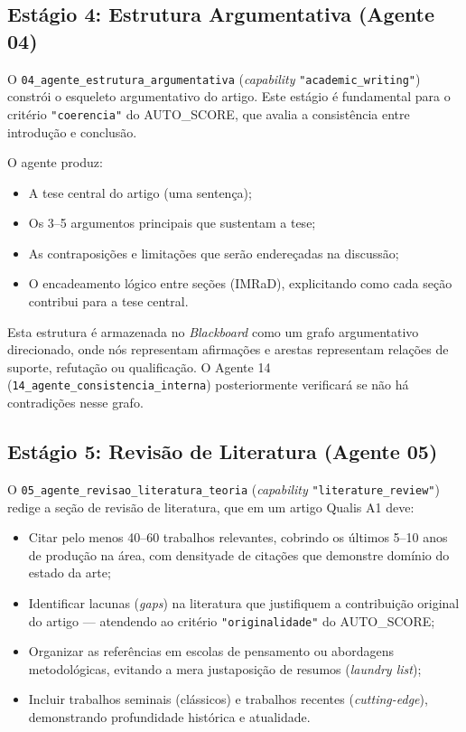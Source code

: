 \subsection{Estágio 4: Estrutura Argumentativa (Agente 04)}
\label{sec:estagio4}

O \texttt{04\_agente\_estrutura\_argumentativa}
(\textit{capability} \texttt{"academic\_writing"}) constrói o
esqueleto argumentativo do artigo. Este estágio é fundamental para
o critério \texttt{"coerencia"} do AUTO\_SCORE, que avalia a
consistência entre introdução e conclusão.

O agente produz:

\begin{itemize}
    \item A tese central do artigo (uma sentença);

    \item Os 3--5 argumentos principais que sustentam a tese;

    \item As contraposições e limitações que serão endereçadas na
    discussão;

    \item O encadeamento lógico entre seções (IMRaD), explicitando
    como cada seção contribui para a tese central.
\end{itemize}

Esta estrutura é armazenada no \textit{Blackboard} como um grafo
argumentativo direcionado, onde nós representam afirmações e
arestas representam relações de suporte, refutação ou qualificação.
O Agente 14 (\texttt{14\_agente\_consistencia\_interna})
posteriormente verificará se não há contradições nesse grafo.

\subsection{Estágio 5: Revisão de Literatura (Agente 05)}
\label{sec:estagio5}

O \texttt{05\_agente\_revisao\_literatura\_teoria}
(\textit{capability} \texttt{"literature\_review"}) redige a seção
de revisão de literatura, que em um artigo Qualis A1 deve:

\begin{itemize}
    \item Citar pelo menos 40--60 trabalhos relevantes, cobrindo os
    últimos 5--10 anos de produção na área, com densityade de
    citações que demonstre domínio do estado da arte;

    \item Identificar lacunas (\textit{gaps}) na literatura que
    justifiquem a contribuição original do artigo — atendendo ao
    critério \texttt{"originalidade"} do AUTO\_SCORE;

    \item Organizar as referências em escolas de pensamento ou
    abordagens metodológicas, evitando a mera justaposição de
    resumos (\textit{laundry list});

    \item Incluir trabalhos seminais (clássicos) e trabalhos
    recentes (\textit{cutting-edge}), demonstrando profundidade
    histórica e atualidade.
\end{itemize}


